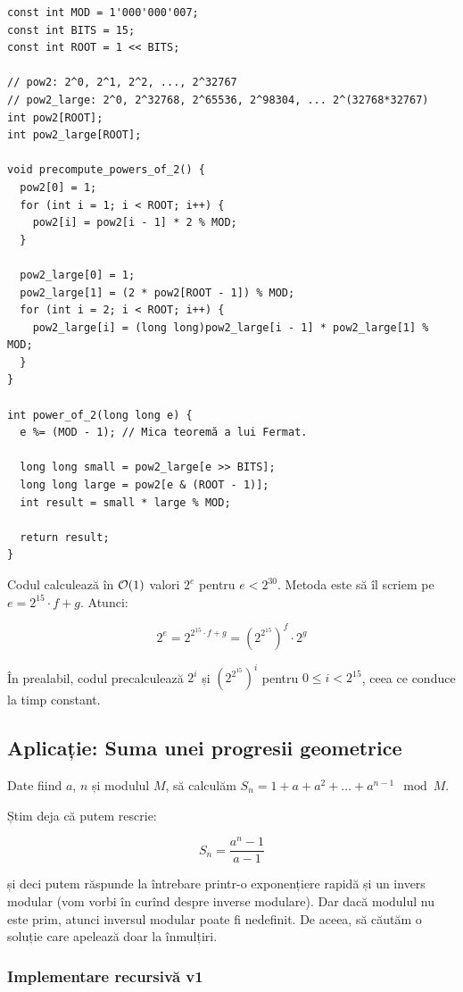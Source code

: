 \documentclass[../main.tex]{subfiles}
\begin{document}
\begin{verbatim}
const int MOD = 1'000'000'007;
const int BITS = 15;
const int ROOT = 1 << BITS;

// pow2: 2^0, 2^1, 2^2, ..., 2^32767
// pow2_large: 2^0, 2^32768, 2^65536, 2^98304, ... 2^(32768*32767)
int pow2[ROOT];
int pow2_large[ROOT];

void precompute_powers_of_2() {
  pow2[0] = 1;
  for (int i = 1; i < ROOT; i++) {
    pow2[i] = pow2[i - 1] * 2 % MOD;
  }

  pow2_large[0] = 1;
  pow2_large[1] = (2 * pow2[ROOT - 1]) % MOD;
  for (int i = 2; i < ROOT; i++) {
    pow2_large[i] = (long long)pow2_large[i - 1] * pow2_large[1] % MOD;
  }
}

int power_of_2(long long e) {
  e %= (MOD - 1); // Mica teoremă a lui Fermat.

  long long small = pow2_large[e >> BITS];
  long long large = pow2[e & (ROOT - 1)];
  int result = small * large % MOD;

  return result;
}
\end{verbatim}

Codul calculează în $\mathcal{O}(1)$ valori $2^e$ pentru $e < 2^{30}$. Metoda este să îl scriem pe $e = 2^{15} \cdot f + g$. Atunci:

$$2^e = 2^{2^{15} \cdot f + g} = (2^{2^{15}})^f \cdot 2^g$$

În prealabil, codul precalculează $2^i$ și $(2^{2^{15}})^i$ pentru $0 \leq i < 2^{15}$, ceea ce conduce la timp constant.

\subsection{Aplicație: Suma unei progresii geometrice}

Date fiind $a$, $n$ și modulul $M$, să calculăm $S_n = 1 + a + a^2 + \dots + a^{n-1} \mod M$.

Știm deja că putem rescrie:

$$S_n = \frac{a^n - 1}{a - 1}$$

și deci putem răspunde la întrebare printr-o exponențiere rapidă și un invers modular (vom vorbi în curînd despre inverse modulare). Dar dacă modulul nu este prim, atunci inversul modular poate fi nedefinit. De aceea, să căutăm o soluție care apelează doar la înmulțiri.

\subsubsection*{Implementare recursivă v1}
\end{document}
